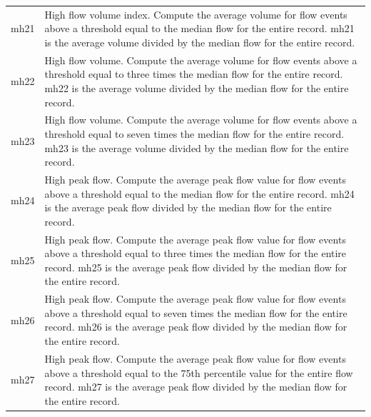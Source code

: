 \documentclass[a4paper,11pt]{article}\usepackage[]{graphicx}\usepackage[]{color}
\begin{document}
\begin{table}[ht]
\begin{threeparttable}[b]
\begin{tabularx}{\textwidth}{|l|X|}
  mh21 & High flow volume index. Compute the average volume for flow events above a threshold equal to the median flow for the entire record. mh21 is the average volume divided by the median flow for the entire record. \\
  mh22 & High flow volume. Compute the average volume for flow events above a threshold equal to three times the median flow for the entire record. mh22 is the average volume divided by the median flow for the entire record. \\
  mh23 & High flow volume. Compute the average volume for flow events above a threshold equal to seven times the median flow for the entire record. mh23 is the average volume divided by the median flow for the entire record. \\
  mh24 & High peak flow. Compute the average peak flow value for flow events above a threshold equal to the median flow for the entire record. mh24 is the average peak flow divided by the median flow for the entire record. \\
  mh25 & High peak flow. Compute the average peak flow value for flow events above a threshold equal to three times the median flow for the entire record. mh25 is the average peak flow divided by the median flow for the entire record. \\
  mh26 & High peak flow. Compute the average peak flow value for flow events above a threshold equal to seven times the median flow for the entire record. mh26 is the average peak flow divided by the median flow for the entire record. \\
  mh27 & High peak flow. Compute the average peak flow value for flow events above a threshold equal to the 75th percentile value for the entire flow record. mh27 is the average peak flow divided by the median flow for the entire record. \\
   \hline
  \end{tabularx}
  \end{threeparttable}
\end{table}
\end{document}
